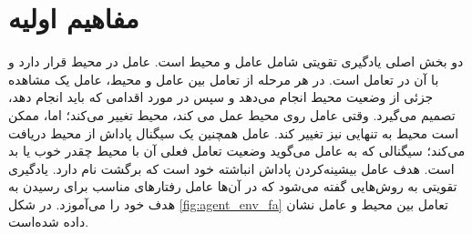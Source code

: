 \section{مفاهیم اولیه}\label{sec:RL_concept}
دو بخش اصلی یادگیری تقویتی
شامل عامل
 و محیط
  است. عامل در محیط قرار دارد و با آن در تعامل است.
  در هر مرحله از تعامل بین عامل و محیط، عامل یک مشاهده جزئی از وضعیت محیط انجام می‌دهد و سپس در مورد اقدامی که باید انجام دهد، تصمیم می‌گیرد. وقتی عامل روی محیط عمل می کند، محیط تغییر می‌کند؛ اما، ممکن است محیط به تنهایی نیز تغییر کند.
  عامل همچنین یک سیگنال پاداش
   از محیط دریافت می‌کند؛ سیگنالی که به عامل می‌گوید وضعیت تعامل فعلی آن با محیط چقدر خوب یا بد است. هدف عامل بیشینه‌کردن پاداش انباشته خود است که برگشت
    نام دارد. یادگیری تقویتی به روش‌هایی گفته می‌شود که در آن‌ها عامل رفتارهای مناسب برای رسیدن به هدف خود را می‌آموزد. در شکل
    \ref{fig:agent_env_fa}
    تعامل بین محیط و عامل نشان داده شده‌است.



